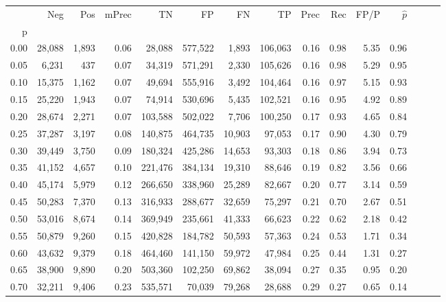 \begin{tabular}{rrrrrrrrrrrrrrr}
\toprule
{} &     Neg &    Pos & mPrec &       TN &       FP &       FN &       TP &  Prec &   Rec &  FP/P & $\hat{p}$ \\
p    &         &        &       &          &          &          &          &       &       &       &           \\
\midrule
0.00 &  28,088 &  1,893 &  0.06 &   28,088 &  577,522 &    1,893 &  106,063 &  0.16 &  0.98 &  5.35 &      0.96 \\
0.05 &   6,231 &    437 &  0.07 &   34,319 &  571,291 &    2,330 &  105,626 &  0.16 &  0.98 &  5.29 &      0.95 \\
0.10 &  15,375 &  1,162 &  0.07 &   49,694 &  555,916 &    3,492 &  104,464 &  0.16 &  0.97 &  5.15 &      0.93 \\
0.15 &  25,220 &  1,943 &  0.07 &   74,914 &  530,696 &    5,435 &  102,521 &  0.16 &  0.95 &  4.92 &      0.89 \\
0.20 &  28,674 &  2,271 &  0.07 &  103,588 &  502,022 &    7,706 &  100,250 &  0.17 &  0.93 &  4.65 &      0.84 \\
0.25 &  37,287 &  3,197 &  0.08 &  140,875 &  464,735 &   10,903 &   97,053 &  0.17 &  0.90 &  4.30 &      0.79 \\
0.30 &  39,449 &  3,750 &  0.09 &  180,324 &  425,286 &   14,653 &   93,303 &  0.18 &  0.86 &  3.94 &      0.73 \\
0.35 &  41,152 &  4,657 &  0.10 &  221,476 &  384,134 &   19,310 &   88,646 &  0.19 &  0.82 &  3.56 &      0.66 \\
0.40 &  45,174 &  5,979 &  0.12 &  266,650 &  338,960 &   25,289 &   82,667 &  0.20 &  0.77 &  3.14 &      0.59 \\
0.45 &  50,283 &  7,370 &  0.13 &  316,933 &  288,677 &   32,659 &   75,297 &  0.21 &  0.70 &  2.67 &      0.51 \\
0.50 &  53,016 &  8,674 &  0.14 &  369,949 &  235,661 &   41,333 &   66,623 &  0.22 &  0.62 &  2.18 &      0.42 \\
0.55 &  50,879 &  9,260 &  0.15 &  420,828 &  184,782 &   50,593 &   57,363 &  0.24 &  0.53 &  1.71 &      0.34 \\
0.60 &  43,632 &  9,379 &  0.18 &  464,460 &  141,150 &   59,972 &   47,984 &  0.25 &  0.44 &  1.31 &      0.27 \\
0.65 &  38,900 &  9,890 &  0.20 &  503,360 &  102,250 &   69,862 &   38,094 &  0.27 &  0.35 &  0.95 &      0.20 \\
0.70 &  32,211 &  9,406 &  0.23 &  535,571 &   70,039 &   79,268 &   28,688 &  0.29 &  0.27 &  0.65 &      0.14 \\

\end{tabular}
